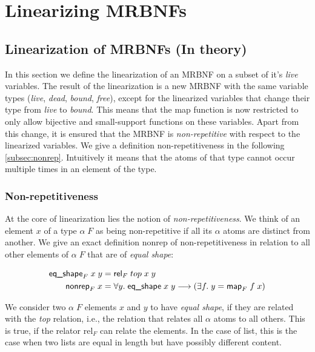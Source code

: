 
\chapter{Linearizing MRBNFs}
\label{chapter:methodology}

\section{Linearization of MRBNFs (In theory)}

  In this section we define the linearization of an MRBNF on a subset of it's \textit{live} variables. The result of the linearization is a new MRBNF with the same variable types (\textit{live}, \textit{dead}, \textit{bound}, \textit{free}), except for the linearized variables that change their type from \textit{live} to \textit{bound}. This means that the map function is now restricted to only allow bijective and small-support functions on these variables. Apart from this change, it is ensured that the MRBNF is \textit{non-repetitive} with respect to the linearized variables. We give a definition non-repetitiveness in the following \autoref{subsec:nonrep}. Intuitively it means that the atoms of that type cannot occur multiple times in an element of the type.

  \subsection{Non-repetitiveness}
  \label{subsec:nonrep}
    At the core of linearization lies the notion of \textit{non-repetitiveness}. We think of an element $x$ of a type $\alpha\; F$ as being non-repetitive if all its $\alpha$ atoms are distinct from another. We give an exact definition \textsf{nonrep} of non-repetitiveness in relation to all other elements of $\alpha\; F$ that are of \textit{equal shape}:

    \begin{align}
      \text{\textsf{eq\_shape}}_F\; x\; y &= \text{\textsf{rel}}_F\; top\; x\; y\\
      \text{\textsf{nonrep}}_F\; x &= \forall y.\; \text{\textsf{eq\_shape}}\; x\; y \longrightarrow (\exists f.\; y = \text{\textsf{map}}_F\; f\; x)
    \end{align}

    We consider two $\alpha\; F$ elements $x$ and $y$ to have \textit{equal shape}, if they are related with the \textit{top} relation, i.e., the relation that relates all $\alpha$ atoms to all others. This is true, if the relator \textsf{rel}$_F$ can relate the elements. In the case of \textsf{list}, this is the case when two lists are equal in length but have possibly different content. 

